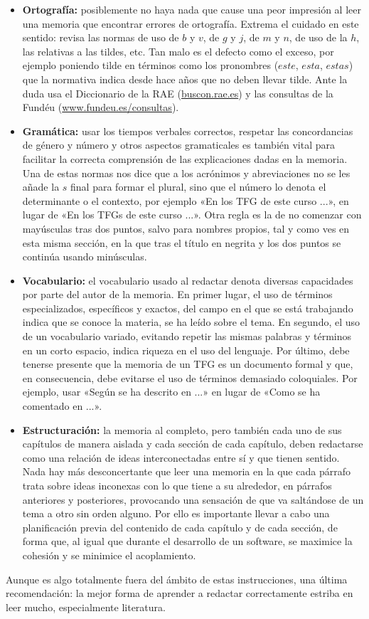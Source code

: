 \begin{itemize}
    \item \textbf{Ortografía:} posiblemente no haya nada que cause una peor impresión al leer una memoria que encontrar errores de ortografía. Extrema el cuidado en este sentido: revisa las normas de uso de $b$ y $v$, de $g$ y $j$, de $m$ y $n$, de uso de la $h$, las relativas a las tildes, etc. Tan malo es el defecto como el exceso, por ejemplo poniendo tilde en términos como los pronombres ($este$, $esta$, $estas$) que la normativa indica desde hace años que no deben llevar tilde. Ante la duda usa el Diccionario de la RAE (\url{buscon.rae.es}) y las consultas de la Fundéu (\url{www.fundeu.es/consultas}).
    
    \item \textbf{Gramática:} usar los tiempos verbales correctos, respetar las concordancias de género y número y otros aspectos gramaticales es también vital para facilitar la correcta comprensión de las explicaciones dadas en la memoria. Una de estas normas nos dice que a los acrónimos y abreviaciones no se les añade la $s$ final para formar el plural, sino que el número lo denota el determinante o el contexto, por ejemplo «En los TFG de este curso ...», en lugar de «En los TFGs de este curso ...». Otra regla es la de no comenzar con mayúsculas tras dos puntos, salvo para nombres propios, tal y como ves en esta misma sección, en la que tras el título en negrita y los dos puntos se continúa usando minúsculas.
    
    \item \textbf{Vocabulario:} el vocabulario usado al redactar denota diversas capacidades por parte del autor de la memoria. En primer lugar, el uso de términos especializados, específicos y exactos, del campo en el que se está trabajando indica que se conoce la materia, se ha leído sobre el tema. En segundo, el uso de un vocabulario variado, evitando repetir las mismas palabras y términos en un corto espacio, indica riqueza en el uso del lenguaje. Por último, debe tenerse presente que la memoria de un TFG es un documento formal y que, en consecuencia, debe evitarse el uso de términos demasiado coloquiales. Por ejemplo, usar «Según se ha descrito en ...» en lugar de «Como se ha comentado en ...».
    
    \item \textbf{Estructuración:} la memoria al completo, pero también cada uno de sus capítulos de manera aislada y cada sección de cada capítulo, deben redactarse como una relación de ideas interconectadas entre sí y que tienen sentido. Nada hay más desconcertante que leer una memoria en la que cada párrafo trata sobre ideas inconexas con lo que tiene a su alrededor, en párrafos anteriores y posteriores, provocando una sensación de que va saltándose de un tema a otro sin orden alguno. Por ello es importante llevar a cabo una planificación previa del contenido de cada capítulo y de cada sección, de forma que, al igual que durante el desarrollo de un software, se maximice la cohesión y se minimice el acoplamiento.
\end{itemize}

Aunque es algo totalmente fuera del ámbito de estas instrucciones, una última recomendación: la mejor forma de aprender a redactar correctamente estriba en leer mucho, especialmente literatura.